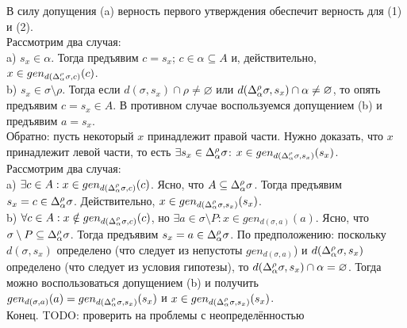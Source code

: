 В силу допущения (a) верность первого утверждения обеспечит верность для (1) и (2).\\
Рассмотрим два случая:\\
\indent a) $s_x \in \alpha$. Тогда предъявим $c = s_x$; $c \in \alpha \subseteq A$ и, действительно, $x \in gen_{d(\Delta_\alpha^\rho\sigma, c)} (c)$.\\
\indent b) $s_x \in \sigma \setminus \rho$. Тогда если $d(\sigma, s_x) \cap \rho \neq \varnothing$ или $d(\Delta_\alpha^\rho\sigma, s_x) \cap \alpha \neq \varnothing$, то опять предъявим $c = s_x \in A$. В противном случае воспользуемся допущением (b) и предъявим $a = s_x$.\\

Обратно: пусть некоторый $x$ принадлежит правой части. Нужно доказать, что $x$ принадлежит левой части, то есть $\exists s_x \in \Delta_\alpha^\rho\sigma$: $x \in gen_{d(\Delta_\alpha^\rho\sigma, s_x)} (s_x)$.\\
Рассмотрим два случая:\\
\indent a) $\exists c \in A: x \in gen_{d(\Delta_\alpha^\rho\sigma, c)} (c)$. Ясно, что $A \subseteq \Delta_\alpha^\rho\sigma$. Тогда предъявим $s_x = c \in \Delta_\alpha^\rho\sigma$. Действительно, $x \in gen_{d(\Delta_\alpha^\rho\sigma, s_x)} (s_x)$.\\
\indent b) $\forall c \in A: x \notin gen_{d(\Delta_\alpha^\rho\sigma, c)} (c)$, но $\exists a \in \sigma \setminus P: x \in gen_{d(\sigma, a)} (a)$. Ясно, что $\sigma \setminus P \subseteq \Delta_\alpha^\rho\sigma$. Тогда предъявим $s_x = a \in \Delta_\alpha^\rho\sigma$. По предположению: поскольку $d(\sigma, s_x)$ определено (что следует из непустоты $gen_{d(\sigma, a)}$) и $d(\Delta_\alpha^\rho\sigma, s_x)$ определено (что следует из условия гипотезы), то $d(\Delta_\alpha^\rho\sigma, s_x) \cap \alpha = \varnothing$. Тогда можно воспользоваться допущением (b) и получить $gen_{d(\sigma, a)} (a) = gen_{d(\Delta_\alpha^\rho\sigma, s_x)} (s_x)$ и $x \in gen_{d(\Delta_\alpha^\rho\sigma, s_x)} (s_x)$.\\

Конец. TODO: проверить на проблемы с неопределённостью

